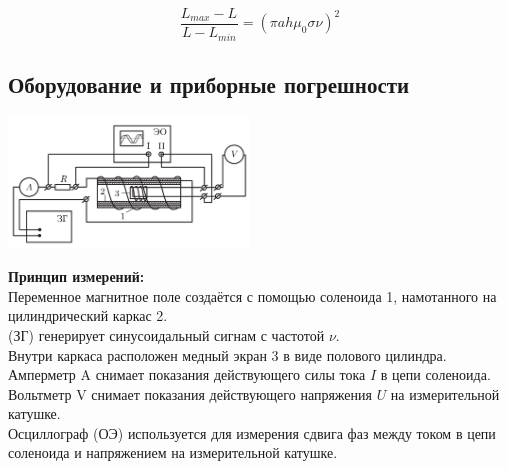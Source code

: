 \documentclass{article}
\begin{document}
\begin{equation}
    \frac{L_{max} - L_{}}{L - L_{min}} = (\pi a h \mu_0 \sigma \nu)^2
\end{equation}








\subsection{Оборудование и приборные погрешности}
\begin{center}
\includegraphics[width=0.48\textwidth]{ustanovka}
\end{center}
\noindent \textbf{Принцип измерений:} \\
Переменное магнитное поле создаётся с помощью соленоида 1, намотанного на цилиндрический каркас 2. \\
(ЗГ) генерирует синусоидальный сигнам с частотой $\nu$. \\
Внутри каркаса расположен медный экран 3 в виде полового цилиндра. \\
Амперметр A снимает показания действующего силы тока $I$ в цепи соленоида. \\
Вольтметр V снимает показания действующего напряжения $U$ на измерительной катушке. \\
Осциллограф (ОЭ) используется для измерения сдвига фаз между током в цепи соленоида и напряжением на измерительной катушке. \\
\end{document}
